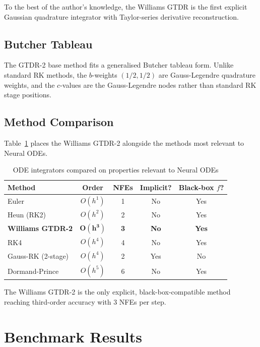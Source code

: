 \documentclass[conference]{IEEEtran}
\begin{document}
To the best of the author's knowledge, the Williams GTDR is the first
explicit Gaussian quadrature integrator with Taylor-series derivative
reconstruction.

\subsection{Butcher Tableau}

The GTDR-2 base method fits a generalised Butcher tableau form. Unlike
standard RK methods, the $b$-weights $(1/2, 1/2)$ are Gauss-Legendre
quadrature weights, and the $c$-values are the Gauss-Legendre nodes
rather than standard RK stage positions.

\subsection{Method Comparison}

Table~\ref{tab:comparison} places the Williams GTDR-2 alongside the
methods most relevant to Neural ODEs.

\begin{table}[ht]
\centering
\caption{ODE integrators compared on properties relevant to Neural ODEs}
\label{tab:comparison}
\begin{tabular}{lcccc}
\toprule
\textbf{Method} & \textbf{Order} & \textbf{NFEs} & \textbf{Implicit?} & \textbf{Black-box $f$?} \\
\midrule
Euler                    & $O(h^1)$ & 1 & No  & Yes \\
Heun (RK2)               & $O(h^2)$ & 2 & No  & Yes \\
\textbf{Williams GTDR-2} & $\mathbf{O(h^3)}$ & \textbf{3} & \textbf{No} & \textbf{Yes} \\
RK4                      & $O(h^4)$ & 4 & No  & Yes \\
Gauss-RK (2-stage)       & $O(h^4)$ & 2 & Yes & No  \\
Dormand-Prince           & $O(h^5)$ & 6 & No  & Yes \\
\bottomrule
\end{tabular}
\end{table}

The Williams GTDR-2 is the only explicit, black-box-compatible method
reaching third-order accuracy with 3 NFEs per step.

\section{Benchmark Results}
\label{sec:benchmark}
\end{document}
